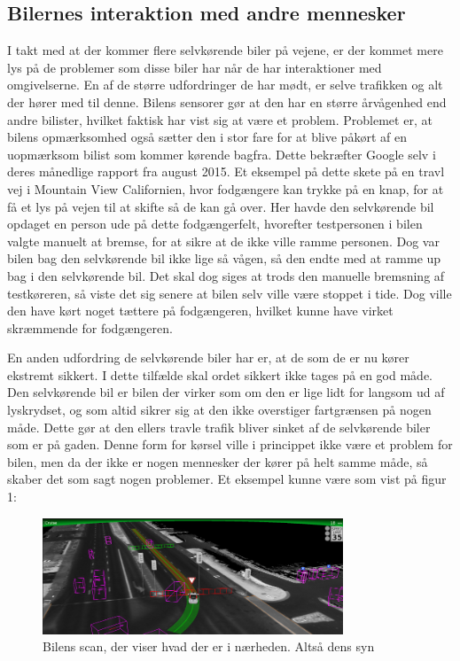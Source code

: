 \subsection{Bilernes interaktion med andre mennesker}
I takt med at der kommer flere  selvkørende biler på vejene, er der kommet mere lys på de problemer som disse biler har når de har interaktioner med omgivelserne. En af de større udfordringer de har mødt, er selve trafikken og alt der hører med til denne. Bilens sensorer gør at den har en større årvågenhed end andre bilister, hvilket faktisk har vist sig at være et problem. Problemet er, at bilens opmærksomhed også sætter den i stor fare for at blive påkørt af en uopmærksom bilist som kommer kørende bagfra. Dette bekræfter Google selv i deres månedlige rapport fra august 2015\cite{GOOG_MONTHLY}. Et eksempel på dette skete på en travl vej i Mountain View Californien, hvor fodgængere kan trykke på en knap, for at få et lys på vejen til at skifte så de kan gå over. Her havde den selvkørende bil opdaget en person ude på dette fodgængerfelt, hvorefter testpersonen i bilen valgte  manuelt at bremse, for at sikre at de ikke ville ramme personen. Dog var bilen bag den selvkørende bil ikke lige så vågen, så den endte med at ramme up bag i den selvkørende bil. Det skal dog siges at trods den manuelle bremsning af testkøreren, så viste det sig senere at bilen selv ville være stoppet i tide. Dog ville den have kørt noget tættere på fodgængeren, hvilket kunne have virket skræmmende for fodgængeren\cite{GOOG_MONTHLY}. 

En anden udfordring de selvkørende biler har er, at de som de er nu kører ekstremt sikkert. I dette tilfælde skal ordet sikkert ikke tages på en god måde. Den selvkørende bil er bilen der virker som om den er lige lidt for langsom ud af lyskrydset, og som altid sikrer sig at den ikke overstiger fartgrænsen på nogen måde. Dette gør at den ellers travle trafik bliver sinket af de selvkørende biler som er på gaden. Denne form for kørsel ville i princippet ikke være et problem for bilen, men da der ikke er nogen mennesker der kører på helt samme måde, så skaber det som sagt nogen problemer. Et eksempel kunne være som vist på figur 1:

\begin{figure}[h!]
    \centering
    \includegraphics[width=0.8\textwidth]{images/google_vision.png}
    \caption{Bilens scan, der viser hvad der er i nærheden. Altså dens syn}
    \label{fig:car_vision}
\end{figure}

